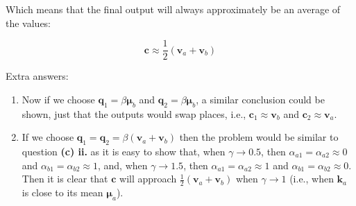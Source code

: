 \begin{parts}
\begin{subparts}
\begin{answer}
    Which means that the final output will always approximately be an average of the values:
    
    $$\mathbf{c}\approx\frac{1}{2}(\mathbf{v}_a+\mathbf{v}_b)$$
    
    Extra answers:
    \begin{enumerate}
        \item Now if we choose $\mathbf{q}_1=\beta \mathbf{\mu}_b$ and $\mathbf{q}_2=\beta \mathbf{\mu}_b$, a similar conclusion could be shown, just that the outputs would swap places, i.e., $\mathbf{c}_1\approx \mathbf{v}_b$ and $\mathbf{c}_2\approx \mathbf{v}_a$.
        \item If we choose $\mathbf{q}_1=\mathbf{q}_2=\beta(\mathbf{v}_a+\mathbf{v}_b)$ then the problem would be similar to question \textbf{(c) ii.} as it is easy to show that, when $\gamma\to 0.5$, then $\alpha_{a1}=\alpha_{a2}\approx 0$ and $\alpha_{b1}=\alpha_{b2}\approx 1$, and, when $\gamma\to 1.5$, then $\alpha_{a1}=\alpha_{a2}\approx 1$ and $\alpha_{b1}=\alpha_{b2}\approx 0$. Then it is clear that $\mathbf{c}$ will approach $\frac{1}{2}(\mathbf{v}_a+\mathbf{v}_b)$ when $\gamma\to 1$ (i.e., when $\mathbf{k}_a$ is close to its mean $\mathbf{\mu}_{a}$).
    \end{enumerate}
\end{answer}



\end{subparts}
\end{parts}
